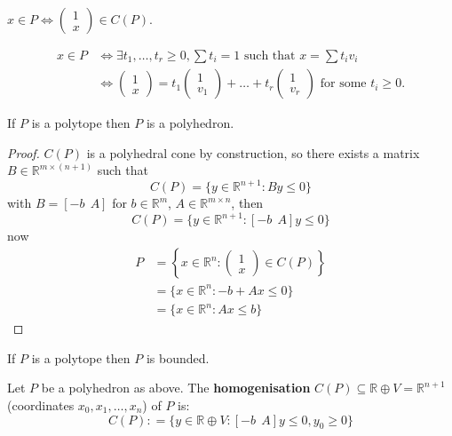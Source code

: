 \documentclass[a4paper,12pt]{amsart}
\begin{document}
 $x \in P \iff \begin{pmatrix} 1 \\ x \end{pmatrix} \in C(P)$.

\begin{align*}
	x\in P &\iff \exists t_1, \ldots, t_r \geq 0, \sum t_i = 1 \text{ such that } x = \sum t_i v_i\\
	&\iff \begin{pmatrix} 1 \\ x \end{pmatrix} = t_1 \begin{pmatrix} 1 \\ v_1 \end{pmatrix} + \ldots + t_r  \begin{pmatrix} 1 \\ v_r \end{pmatrix}  \text{ for some } t_i \geq 0.
\end{align*}

\begin{Corollary}
	If $P$ is a polytope then $P$ is a polyhedron.
\end{Corollary}

\begin{proof}
	$C(P)$ is a polyhedral cone by construction, so there exists a matrix $B \in \mathbb{R}^{m \times (n+1)}$ such that
	\[ C(P) = \{ y\in \mathbb{R}^{n+1} : By \leq 0\} \]
	with $B = [-b \ \ A] $ for $b\in \mathbb{R}^m$, $A \in \mathbb{R}^{m\times n}$, then 
	\[C(P) = \{y \in \mathbb{R}^{n+1}: [-b \ \ A]y \leq 0\} \]
	now
	\begin{align*}
		P &= \left\{ x \in \mathbb{R}^{n} : \begin{pmatrix} 1 \\ x \end{pmatrix} \in C(P) \right\}\\
		&= \{x \in \mathbb{R}^n : -b +Ax \leq 0\} \\
		&= \{ x\in \mathbb{R}^n : Ax \leq b\}
	\end{align*}
\end{proof}

\begin{Remark}
	If $P$ is a polytope then $P$ is bounded.
\end{Remark}

\begin{Def}
	Let $P$ be a polyhedron as above.  The {\bf homogenisation} $C(P) \subseteq \mathbb{R} \oplus V = \mathbb{R}^{n+1}$ (coordinates $x_0, x_1, \ldots, x_n$) of $P$ is:
	\[ C(P) : = \{ y\in \mathbb{R}\oplus V : [-b \ \ A] y \leq 0, y_0 \geq 0\}\]
\end{Def}
\end{document}
